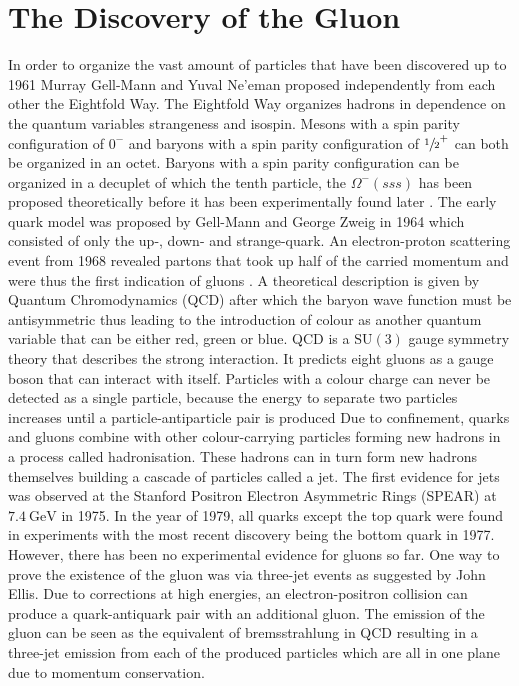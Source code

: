\chapter{The Discovery of the Gluon}

In order to organize the vast amount of particles that have been discovered up to 1961 Murray Gell-Mann and Yuval Ne'eman proposed independently from each other the Eightfold Way.
The Eightfold Way organizes hadrons in dependence on the quantum variables strangeness and isospin. 
Mesons with a spin parity configuration of $0^-$ and baryons with a spin parity configuration of $\sfrac 12^+$ can both be organized in an octet.
Baryons with a spin parity configuration can be organized in a decuplet of which the tenth particle, the $\Omega^-(sss)$ has been proposed theoretically before it has been experimentally found later \cite{Fritzsch2018}.
The early quark model was proposed by Gell-Mann and George Zweig in 1964 which consisted of only the up-, down- and strange-quark.
An electron-proton scattering event from 1968 revealed partons that took up half of the carried momentum and were thus the first indication of gluons \cite{Venker}.
A theoretical description is given by Quantum Chromodynamics (QCD) after which the baryon wave function must be antisymmetric thus leading to the introduction of colour as another quantum variable that can be either red, green or blue.
QCD is a $\text{SU}(3)$ gauge symmetry theory that describes the strong interaction.
It predicts eight gluons as a gauge boson that can interact with itself.
Particles with a colour charge can never be detected as a single particle, because the energy to separate two particles increases until a particle-antiparticle pair is produced
Due to confinement, quarks and gluons combine with other colour-carrying particles forming new hadrons in a process called hadronisation.
These hadrons can in turn form new hadrons themselves building a cascade of particles called a jet.
The first evidence for jets was observed at the Stanford Positron Electron Asymmetric Rings (SPEAR) at $\SI{7.4}{\giga\eV}$ in 1975.
In the year of 1979, all quarks except the top quark were found in experiments with the most recent discovery being the bottom quark in 1977.
However, there has been no experimental evidence for gluons so far.
One way to prove the existence of the gluon was via three-jet events as suggested by John Ellis.
Due to corrections at high energies, an electron-positron collision can produce a quark-antiquark pair with an additional gluon.
The emission of the gluon can be seen as the equivalent of bremsstrahlung in QCD resulting in a three-jet emission from each of the produced particles which are all in one plane due to momentum conservation.

